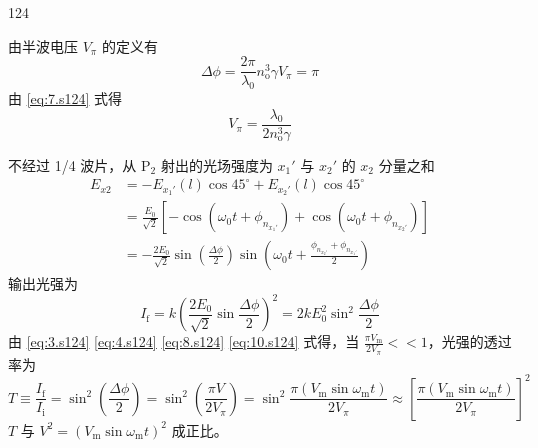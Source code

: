 \begin{solution}{124}
\begin{subsolution}
        由半波电压 $V_{\pi}$ 的定义有
        \begin{equation}
            \Delta \phi = \frac{2 \pi}{\lambda_{0}} n_{\mathrm{o}}^{3} \gamma V_{\pi} = \pi
            \label{eq:7.s124}
        \end{equation}
        由 \eqref{eq:7.s124} 式得
        \begin{equation}
            V_{\pi} = \frac{\lambda_{0}}{2 n_{\mathrm{o}}^{3} \gamma}
            \label{eq:8.s124}
        \end{equation}
    \end{subsolution}
    \begin{subsolution}
        不经过 1/4 波片，从 $\mathrm{P}_{2}$ 射出的光场强度为 $x_{1}'$ 与 $x_{2}'$ 的 $x_{2}$ 分量之和
        \begin{align}
            E_{x 2} & = -E_{x_{1}'}(l) \cos 45^{\circ} + E_{x_{2}'}(l) \cos 45^{\circ} \nonumber \\
            & = \frac{E_{0}}{\sqrt{2}} [-\cos (\omega_{0} t + \phi_{n_{x_{1}'}}) + \cos (\omega_{0} t + \phi_{n_{x_{2}'}})] \nonumber \\
            & = -\frac{2 E_{0}}{\sqrt{2}} \sin (\frac{\Delta \phi}{2}) \sin (\omega_{0} t + \frac{\phi_{n_{x_{2}'}} + \phi_{n_{x_{1}'}}}{2})
            \label{eq:9.s124}
        \end{align}
        输出光强为
        \begin{equation}
            I_{\mathrm{f}} = k \left(\frac{2 E_{0}}{\sqrt{2}} \sin \frac{\Delta \phi}{2}\right)^{2} = 2 k E_{0}^{2} \sin^{2} \frac{\Delta \phi}{2}
            \label{eq:10.s124}
        \end{equation}
        由 \eqref{eq:3.s124} \eqref{eq:4.s124} \eqref{eq:8.s124} \eqref{eq:10.s124} 式得，当 $\frac{\pi V_{\mathrm{m}}}{2 V_{\pi}} << 1$，光强的透过率为
        \begin{equation}
            T \equiv \frac{I_{\mathrm{f}}}{I_{\mathrm{i}}} = \sin^{2} \left(\frac{\Delta \phi}{2}\right) = \sin^{2} \left(\frac{\pi V}{2 V_{\pi}}\right) = \sin^{2} \frac{\pi (V_{\mathrm{m}} \sin \omega_{\mathrm{m}} t)}{2 V_{\pi}} \approx \left[ \frac{\pi (V_{\mathrm{m}} \sin \omega_{\mathrm{m}} t)}{2 V_{\pi}} \right]^{2}
            \label{eq:11.s124}
        \end{equation}
        $T$ 与 $V^{2} = (V_{\mathrm{m}} \sin \omega_{\mathrm{m}} t)^{2}$ 成正比。


\end{subsolution}
\end{solution}
